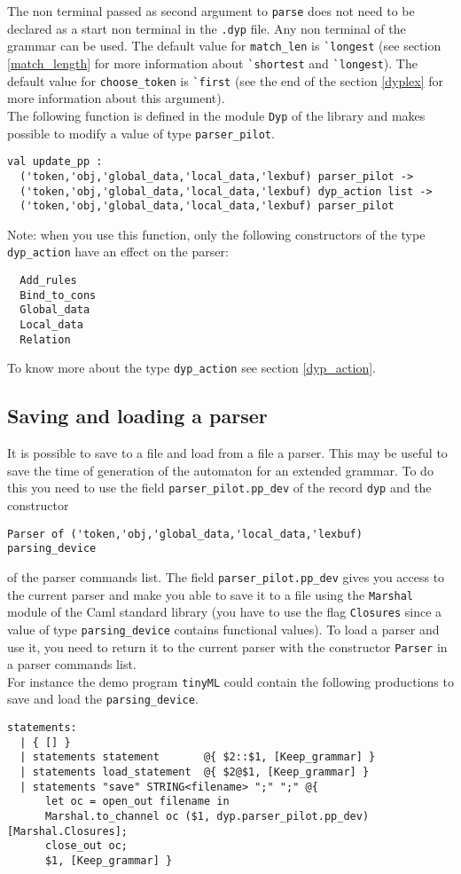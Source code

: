 \documentclass[12pt]{article}
\begin{document}
{The non terminal passed as second argument to \verb|parse| does not need to be declared as a start non terminal in the \verb|.dyp| file. Any non terminal of the grammar can be used. The default value for \verb|match_len| is \verb|`longest| (see section \ref{match_length} for more information about  \verb|`shortest| and \verb|`longest|). The default value for \verb|choose_token| is \verb|`first| (see the end of the section \ref{dyplex} for more information about this argument).\\

The following function is defined in the module \verb|Dyp| of the library and makes possible to modify a value of type \verb|parser_pilot|.
\begin{verbatim}
val update_pp :
  ('token,'obj,'global_data,'local_data,'lexbuf) parser_pilot ->
  ('token,'obj,'global_data,'local_data,'lexbuf) dyp_action list ->
  ('token,'obj,'global_data,'local_data,'lexbuf) parser_pilot
\end{verbatim}
Note: when you use this function, only the following constructors of the type \verb|dyp_action| have an effect on the parser:
\begin{verbatim}
  Add_rules
  Bind_to_cons
  Global_data
  Local_data
  Relation
\end{verbatim}
To know more about the type \verb|dyp_action| see section \ref{dyp_action}.

\subsection{Saving and loading a parser}\label{load_parser}

It is possible to save to a file and load from a file a parser. This may be useful to save the time of generation of the automaton for an extended grammar. To do this you need to use the field \verb|parser_pilot.pp_dev| of the record \verb|dyp| and the constructor
\begin{verbatim}
Parser of ('token,'obj,'global_data,'local_data,'lexbuf) parsing_device
\end{verbatim}
of the parser commands list. The field \verb|parser_pilot.pp_dev| gives you access to the current parser and make you able to save it to a file using the \verb|Marshal| module of the Caml standard library (you have to use the flag \verb|Closures| since a value of type \verb|parsing_device| contains functional values). To load a parser and use it, you need to return it to the current parser with the constructor \verb|Parser| in a parser commands list.\\
For instance the demo program \verb|tinyML| could contain the following productions to save and load the \verb|parsing_device|.
\begin{verbatim}
statements:
  | { [] }
  | statements statement       @{ $2::$1, [Keep_grammar] }
  | statements load_statement  @{ $2@$1, [Keep_grammar] }
  | statements "save" STRING<filename> ";" ";" @{
      let oc = open_out filename in
      Marshal.to_channel oc ($1, dyp.parser_pilot.pp_dev) [Marshal.Closures];
      close_out oc;
      $1, [Keep_grammar] }


\end{verbatim}}
\end{document}
